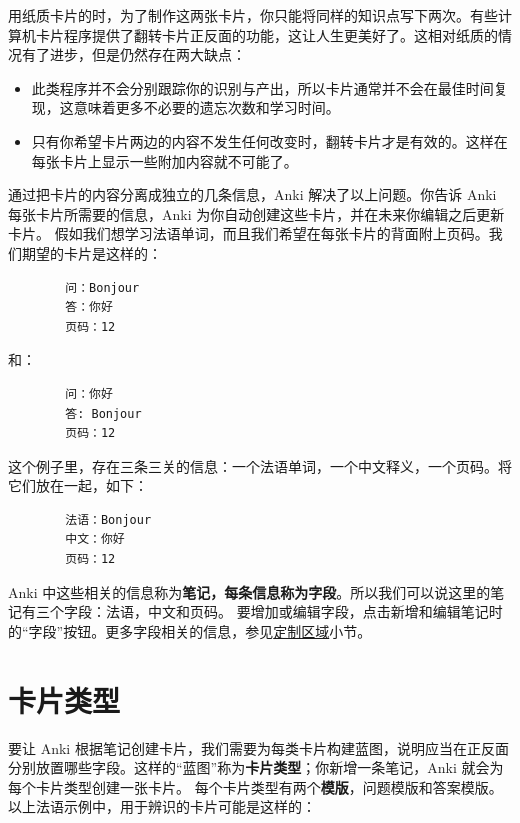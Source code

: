\documentclass[a4paper]{book}
\begin{document}
	用纸质卡片的时，为了制作这两张卡片，你只能将同样的知识点写下两次。有些计算机卡片程序提供了翻转卡片正反面的功能，这让人生更美好了。这相对纸质的情况有了进步，但是仍然存在两大缺点：
	
	\begin{itemize}
		\itemsep1pt\parskip0pt
		\item 此类程序并不会分别跟踪你的识别与产出，所以卡片通常并不会在最佳时间复现，这意味着更多不必要的遗忘次数和学习时间。
		\item 只有你希望卡片两边的内容不发生任何改变时，翻转卡片才是有效的。这样在每张卡片上显示一些附加内容就不可能了。
	\end{itemize}
	
	通过把卡片的内容分离成独立的几条信息，Anki 解决了以上问题。你告诉 Anki 每张卡片所需要的信息，Anki 为你自动创建这些卡片，并在未来你编辑之后更新卡片。
	假如我们想学习法语单词，而且我们希望在每张卡片的背面附上页码。我们期望的卡片是这样的：
	
	\begin{shaded}\begin{verbatim}
		问：Bonjour
		答：你好
		页码：12
		\end{verbatim}\end{shaded}
	
	和：
	\begin{shaded}\begin{verbatim}
		问：你好
		答: Bonjour
		页码：12
		\end{verbatim}\end{shaded}
	
	这个例子里，存在三条三关的信息：一个法语单词，一个中文释义，一个页码。将它们放在一起，如下：
	
	\begin{shaded}\begin{verbatim}
		法语：Bonjour
		中文：你好
		页码：12
		\end{verbatim}\end{shaded}
	
	Anki 中这些相关的信息称为\textbf{笔记，每条信息称为字段}。所以我们可以说这里的笔记有三个字段：法语，中文和页码。
	要增加或编辑字段，点击新增和编辑笔记时的“字段”按钮。更多字段相关的信息，参见\hyperref[fields]{定制区域}小节。
	
	\section{卡片类型}
	
	要让 Anki 根据笔记创建卡片，我们需要为每类卡片构建蓝图，说明应当在正反面分别放置哪些字段。这样的“蓝图”称为\textbf{卡片类型}；你新增一条笔记，Anki 就会为每个卡片类型创建一张卡片。
	每个卡片类型有两个\textbf{模版}，问题模版和答案模版。以上法语示例中，用于辨识的卡片可能是这样的：
	
\end{document}
